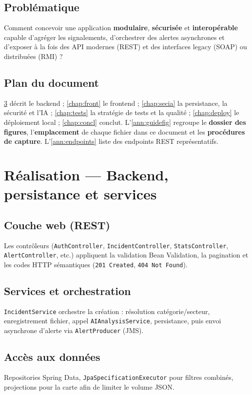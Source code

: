 \documentclass[12pt,a4paper,twoside,openany]{book}
\begin{document}
\section{Problématique}
Comment concevoir une application \textbf{modulaire}, \textbf{sécurisée} et \textbf{interopérable} capable d'agréger les signalements, d'orchestrer des alertes asynchrones et d'exposer à la fois des API modernes (REST) et des interfaces legacy (SOAP) ou distribuées (RMI) ?

\section{Plan du document}
\cref{chap:real} décrit le backend ; \cref{chap:front} le frontend ; \cref{chap:secia} la persistance, la sécurité et l'IA ; \cref{chap:tests} la stratégie de tests et la qualité ; \cref{chap:deploy} le déploiement local ; \cref{chap:concl} conclut. L'\cref{ann:guidefig} regroupe le \textbf{dossier des figures}, l'\textbf{emplacement} de chaque fichier dans ce document et les \textbf{procédures de capture}. L'\cref{ann:endpoints} liste des endpoints REST représentatifs.

\chapter{R\'ealisation — Backend, persistance et services}
\label{chap:real}
\section{Couche web (REST)}
Les contrôleurs (\texttt{AuthController}, \texttt{IncidentController}, \texttt{StatsController}, \texttt{AlertController}, etc.) appliquent la validation Bean Validation, la pagination et les codes HTTP sémantiques (\texttt{201 Created}, \texttt{404 Not Found}).

\section{Services et orchestration}
\texttt{IncidentService} orchestre la création : résolution catégorie/secteur, enregistrement fichier, appel \texttt{AIAnalysisService}, persistance, puis envoi asynchrone d'alerte via \texttt{AlertProducer} (JMS).

\section{Accès aux données}
Repositories Spring Data, \texttt{JpaSpecificationExecutor} pour filtres combinés, projections pour la carte afin de limiter le volume JSON.
\end{document}
